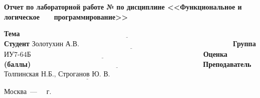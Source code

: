\documentclass[12pt]{report}
\begin{document}
\begin{titlepage}
		\begin{center}
			\noindent\begin{minipage}{1.1\textwidth}\centering
				\Large\textbf{Отчет по лабораторной работе №}\newline
				\textbf{по дисциплине <<Функциональное и логическое}\newline
				\textbf{~~~программирование>>}\newline\newline
			\end{minipage}
		\end{center}
		
		\noindent\textbf{Тема} $\underline{\text{~~~~~~~~~~~~~~~~~~~~~~~~~~~~~~~~~~~~~~~~~~~~~~~~~~~~~~~~~~~~~~~~~~~~~~~~~~~~~~~~~~~~~~~~~~}}$\newline\newline
		\noindent\textbf{Студент} $\underline{\text{Золотухин А.В.~~~~~~~~~~~~~~~~~~~~~~~~~~~~~~~~~~~~~~~~~~~~~~~~~~~~~~~~~~~~~~~~~}}$\newline\newline
		\noindent\textbf{Группа} $\underline{\text{ИУ7-64Б~~~~~~~~~~~~~~~~~~~~~~~~~~~~~~~~~~~~~~~~~~~~~~~~~~~~~~~~~~~~~~~~~~~~~~~~~}}$\newline\newline
		\noindent\textbf{Оценка (баллы)} $\underline{\text{~~~~~~~~~~~~~~~~~~~~~~~~~~~~~~~~~~~~~~~~~~~~~~~~~~~~~~~~~~~~~~~~~~~~~~~~}}$\newline\newline
		\noindent\textbf{Преподаватель} $\underline{\text{Толпинская Н.Б., Строганов Ю. В.~~~~~~~~~~~~~~~~~~~~~~~~~~}}$\newline\newline\newline
		
		\begin{center}
			\vfill
			Москва~---~\the\year
			~г.
		\end{center}
	\end{titlepage}
	
	
\end{document}
